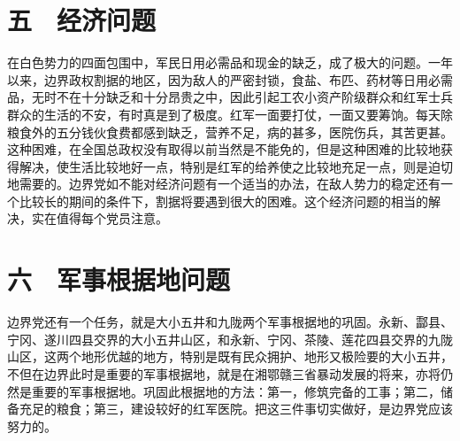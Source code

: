 \section{五　经济问题}

在白色势力的四面包围中，军民日用必需品和现金的缺乏，成了极大的问题。一年以来，边界政权割据的地区，因为敌人的严密封锁，食盐、布匹、药材等日用必需品，无时不在十分缺乏和十分昂贵之中，因此引起工农小资产阶级群众和红军士兵群众的生活的不安，有时真是到了极度。红军一面要打仗，一面又要筹饷。每天除粮食外的五分钱伙食费都感到缺乏，营养不足，病的甚多，医院伤兵，其苦更甚。这种困难，在全国总政权没有取得以前当然是不能免的，但是这种困难的比较地获得解决，使生活比较地好一点，特别是红军的给养使之比较地充足一点，则是迫切地需要的。边界党如不能对经济问题有一个适当的办法，在敌人势力的稳定还有一个比较长的期间的条件下，割据将要遇到很大的困难。这个经济问题的相当的解决，实在值得每个党员注意。

\section{六　军事根据地问题}

边界党还有一个任务，就是大小五井和九陇两个军事根据地的巩固。永新、酃县、宁冈、遂川四县交界的大小五井山区，和永新、宁冈、茶陵、莲花四县交界的九陇山区，这两个地形优越的地方，特别是既有民众拥护、地形又极险要的大小五井，不但在边界此时是重要的军事根据地，就是在湘鄂赣三省暴动发展的将来，亦将仍然是重要的军事根据地。巩固此根据地的方法：第一，修筑完备的工事；第二，储备充足的粮食；第三，建设较好的红军医院。把这三件事切实做好，是边界党应该努力的。


